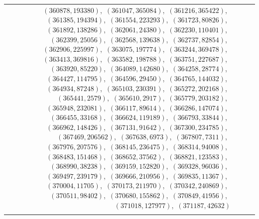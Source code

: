 \documentclass[11pt]{article}
\begin{document}
\begin{longtable}{@{}rrl>{\raggedright\arraybackslash}p{}@{}}
$(360878,193380)$,\allowbreak\ $(361047,365084)$,\allowbreak\ $(361216,365422)$,\allowbreak\ $(361385,194394)$,\allowbreak\ $(361554,223293)$,\allowbreak\ $(361723,80826)$,\allowbreak\ $(361892,138286)$,\allowbreak\ $(362061,24380)$,\allowbreak\ $(362230,110401)$,\allowbreak\ $(362399,25056)$,\allowbreak\ $(362568,139638)$,\allowbreak\ $(362737,82854)$,\allowbreak\ $(362906,225997)$,\allowbreak\ $(363075,197774)$,\allowbreak\ $(363244,369478)$,\allowbreak\ $(363413,369816)$,\allowbreak\ $(363582,198788)$,\allowbreak\ $(363751,227687)$,\allowbreak\ $(363920,85220)$,\allowbreak\ $(364089,142680)$,\allowbreak\ $(364258,28774)$,\allowbreak\ $(364427,114795)$,\allowbreak\ $(364596,29450)$,\allowbreak\ $(364765,144032)$,\allowbreak\ $(364934,87248)$,\allowbreak\ $(365103,230391)$,\allowbreak\ $(365272,202168)$,\allowbreak\ $(365441,2579)$,\allowbreak\ $(365610,2917)$,\allowbreak\ $(365779,203182)$,\allowbreak\ $(365948,232081)$,\allowbreak\ $(366117,89614)$,\allowbreak\ $(366286,147074)$,\allowbreak\ $(366455,33168)$,\allowbreak\ $(366624,119189)$,\allowbreak\ $(366793,33844)$,\allowbreak\ $(366962,148426)$,\allowbreak\ $(367131,91642)$,\allowbreak\ $(367300,234785)$,\allowbreak\ $(367469,206562)$,\allowbreak\ $(367638,6973)$,\allowbreak\ $(367807,7311)$,\allowbreak\ $(367976,207576)$,\allowbreak\ $(368145,236475)$,\allowbreak\ $(368314,94008)$,\allowbreak\ $(368483,151468)$,\allowbreak\ $(368652,37562)$,\allowbreak\ $(368821,123583)$,\allowbreak\ $(368990,38238)$,\allowbreak\ $(369159,152820)$,\allowbreak\ $(369328,96036)$,\allowbreak\ $(369497,239179)$,\allowbreak\ $(369666,210956)$,\allowbreak\ $(369835,11367)$,\allowbreak\ $(370004,11705)$,\allowbreak\ $(370173,211970)$,\allowbreak\ $(370342,240869)$,\allowbreak\ $(370511,98402)$,\allowbreak\ $(370680,155862)$,\allowbreak\ $(370849,41956)$,\allowbreak\ $(371018,127977)$,\allowbreak\ $(371187,42632)$\\
\addlinespace[3pt]
\end{longtable}
\endgroup
\end{document}
